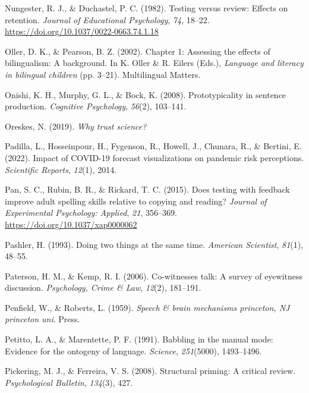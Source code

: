 \documentclass[
]{krantz}
\newlength{\cslhangindent}
\newenvironment{CSLReferences}[2] %
 {\begin{list}{}{%
  \setlength{\itemindent}{0pt}
  \setlength{\leftmargin}{0pt}
  \setlength{\parsep}{0pt}
  \ifodd #1
   \setlength{\leftmargin}{\cslhangindent}
   \setlength{\itemindent}{-1\cslhangindent}
  \fi
  \setlength{\itemsep}{#2\baselineskip}}}
 {\end{list}}
\begin{document}
\begin{CSLReferences}{1}{0}
Nungester, R. J., \& Duchastel, P. C. (1982). Testing versus review: Effects on retention. \emph{Journal of Educational Psychology}, \emph{74}, 18--22. \url{https://doi.org/10.1037/0022-0663.74.1.18}

Oller, D. K., \& Pearson, B. Z. (2002). Chapter 1: Assessing the effects of bilingualism: A background. In K. Oller \& R. Eilers (Eds.), \emph{Language and literacy in bilingual children} (pp. 3--21). Multilingual Matters.

Onishi, K. H., Murphy, G. L., \& Bock, K. (2008). Prototypicality in sentence production. \emph{Cognitive Psychology}, \emph{56}(2), 103--141.

Oreskes, N. (2019). \emph{Why trust science?}

Padilla, L., Hosseinpour, H., Fygenson, R., Howell, J., Chunara, R., \& Bertini, E. (2022). Impact of COVID-19 forecast visualizations on pandemic risk perceptions. \emph{Scientific Reports}, \emph{12}(1), 2014.

Pan, S. C., Rubin, B. R., \& Rickard, T. C. (2015). Does testing with feedback improve adult spelling skills relative to copying and reading? \emph{Journal of Experimental Psychology: Applied}, \emph{21}, 356--369. \url{https://doi.org/10.1037/xap0000062}

Pashler, H. (1993). Doing two things at the same time. \emph{American Scientist}, \emph{81}(1), 48--55.

Paterson, H. M., \& Kemp, R. I. (2006). Co-witnesses talk: A survey of eyewitness discussion. \emph{Psychology, Crime \& Law}, \emph{12}(2), 181--191.

Penfield, W., \& Roberts, L. (1959). \emph{Speech \& brain mechanisms princeton, NJ princeton uni}. Press.

Petitto, L. A., \& Marentette, P. F. (1991). Babbling in the manual mode: Evidence for the ontogeny of language. \emph{Science}, \emph{251}(5000), 1493--1496.

Pickering, M. J., \& Ferreira, V. S. (2008). Structural priming: A critical review. \emph{Psychological Bulletin}, \emph{134}(3), 427.


\end{CSLReferences}
\end{document}
